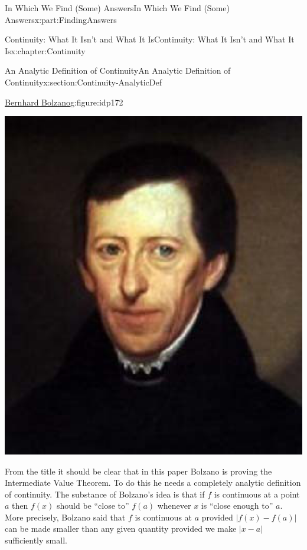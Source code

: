 \documentclass[oneside,10pt,]{book}
\numberwithin{equation}{section}
\newcommand{\abs}[1]{\left|#1\right|}
\begin{document}
\begin{partptx}{In Which We Find (Some) Answers}{}{In Which We Find (Some) Answers}{}{}{x:part:FindingAnswers}
\begin{chapterptx}{Continuity: What It Isn't and What It Is}{}{Continuity: What It Isn't and What It Is}{}{}{x:chapter:Continuity}
\begin{sectionptx}{An Analytic Definition of Continuity}{}{An Analytic Definition of Continuity}{}{}{x:section:Continuity-AnalyticDef}
\begin{figureptx}{\href{https://mathshistory.st-andrews.ac.uk/Biographies/Bolzano/}{Bernhard Bolzano}\protect\footnotemark{}}{g:figure:idp172}{}%
%
\begin{image}{0.325}{0.35}{0.325}%
\includegraphics[width=\linewidth]{images/Bolzano.png}
\end{image}%
\tcblower
\end{figureptx}%
%
From the title it should be clear that in this paper Bolzano is proving the Intermediate Value Theorem.  To do this he needs a completely analytic definition of continuity.  The substance of Bolzano's idea is that if \(f\) is continuous at a point \(a\) then \(f(x)\) should be ``close to'' \(f(a)\) whenever \(x\) is ``close enough to'' \(a\).  More precisely, Bolzano said that \(f\) is continuous at \(a\) provided \(\abs{f(x)-f(a)}\) can be made smaller than any given quantity provided we make \(\abs{x-a}\) sufficiently small.%
\par

\end{sectionptx}
\end{chapterptx}
\end{partptx}
\end{document}
